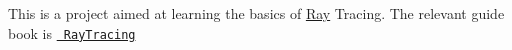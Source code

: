 This is a project aimed at learning the basics of \mbox{\hyperlink{classRay}{Ray}} Tracing. The relevant guide book is \href{https://raytracing.github.io/books/RayTracingInOneWeekend.html}{\texttt{ Ray\+Tracing}} 